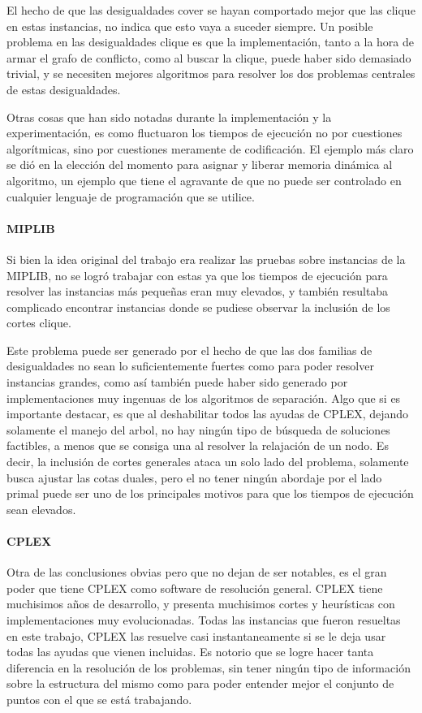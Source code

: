 El hecho de que las desigualdades cover se hayan comportado mejor que las clique en estas instancias, no indica que esto vaya a suceder siempre. Un posible problema en las desigualdades clique es que la implementaci\'on, tanto a la hora de armar el grafo de conflicto, como al buscar la clique, puede haber sido demasiado trivial, y se necesiten mejores algoritmos para resolver los dos problemas centrales de estas desigualdades.

Otras cosas que han sido notadas durante la implementaci\'on y la experimentaci\'on, es como fluctuaron los tiempos de ejecuci\'on no por cuestiones algor\'itmicas, sino por cuestiones meramente de codificaci\'on. El ejemplo m\'as claro se di\'o en la elecci\'on del momento para asignar y liberar memoria din\'amica al algoritmo, un ejemplo que tiene el agravante de que no puede ser controlado en cualquier lenguaje de programaci\'on que se utilice.

\medskip
\paragraph{MIPLIB}
Si bien la idea original del trabajo era realizar las pruebas sobre instancias de la MIPLIB, no se logr\'o trabajar con estas ya que los tiempos de ejecuci\'on para resolver las instancias m\'as peque\~nas eran muy elevados, y tambi\'en resultaba complicado encontrar instancias donde se pudiese observar la inclusi\'on de los cortes clique.

Este problema puede ser generado por el hecho de que las dos familias de desigualdades no sean lo suficientemente fuertes como para poder resolver instancias grandes, como as\'i tambi\'en puede haber sido generado por implementaciones muy ingenuas de los algoritmos de separaci\'on. Algo que si es importante destacar, es que al deshabilitar todos las ayudas de CPLEX, dejando solamente el manejo del arbol, no hay ning\'un tipo de b\'usqueda de soluciones factibles, a menos que se consiga una al resolver la relajaci\'on de un nodo. Es decir, la inclusi\'on de cortes generales ataca un solo lado del problema, solamente busca ajustar las cotas duales, pero el no tener ning\'un abordaje por el lado primal puede ser uno de los principales motivos para que los tiempos de ejecuci\'on sean elevados.


\paragraph{CPLEX}


Otra de las conclusiones obvias pero que no dejan de ser notables, es el gran poder que tiene CPLEX como software de resoluci\'on general. CPLEX tiene muchisimos a\~nos de desarrollo, y presenta muchisimos cortes y heur\'isticas con implementaciones muy evolucionadas. Todas las instancias que fueron resueltas en este trabajo, CPLEX las resuelve casi instantaneamente si se le deja usar todas las ayudas que vienen incluidas. Es notorio que se logre hacer tanta diferencia en la resoluci\'on de los problemas, sin tener ning\'un tipo de informaci\'on sobre la estructura del mismo como para poder entender mejor el conjunto de puntos con el que se est\'a trabajando.

